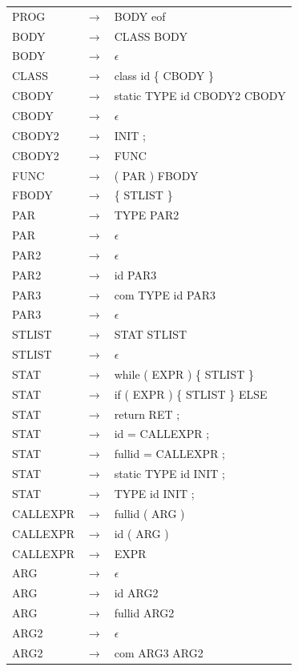 \documentclass[11pt,a4paper]{article}
\begin{document}
\begin{tabular}{l c l}
PROG & $\rightarrow$ & BODY eof \\
BODY & $\rightarrow$ & CLASS BODY \\
BODY & $\rightarrow$ & $\epsilon$ \\
CLASS & $\rightarrow$& class id \{ CBODY \} \\
CBODY &$\rightarrow$& static TYPE id CBODY2 CBODY \\
CBODY &$\rightarrow$& $\epsilon$ \\
CBODY2 &$\rightarrow$& INIT ; \\
CBODY2 &$\rightarrow$& FUNC \\
FUNC &$\rightarrow$& ( PAR ) FBODY \\
FBODY &$\rightarrow$& \{ STLIST \} \\
PAR &$\rightarrow$& TYPE PAR2 \\
PAR &$\rightarrow$& $\epsilon$ \\
PAR2 &$\rightarrow$& $\epsilon$ \\
PAR2 &$\rightarrow$& id PAR3 \\
PAR3 &$\rightarrow$& com TYPE id PAR3 \\
PAR3 &$\rightarrow$& $\epsilon$ \\
STLIST &$\rightarrow$& STAT STLIST \\
STLIST &$\rightarrow$&  $\epsilon$ \\
STAT &$\rightarrow$& while ( EXPR ) \{ STLIST \} \\
STAT &$\rightarrow$& if ( EXPR ) \{ STLIST \} ELSE \\
STAT &$\rightarrow$& return RET ; \\
STAT &$\rightarrow$& id = CALLEXPR ; \\
STAT &$\rightarrow$& fullid = CALLEXPR ; \\
STAT &$\rightarrow$& static TYPE id INIT ; \\
STAT &$\rightarrow$& TYPE id INIT ; \\
CALLEXPR &$\rightarrow$& fullid ( ARG ) \\
CALLEXPR &$\rightarrow$& id ( ARG ) \\
CALLEXPR &$\rightarrow$& EXPR \\
ARG &$\rightarrow$& $\epsilon$ \\
ARG &$\rightarrow$& id ARG2 \\
ARG &$\rightarrow$& fullid ARG2 \\
ARG2 &$\rightarrow$& $\epsilon$ \\
ARG2 &$\rightarrow$& com ARG3 ARG2 \\

\end{tabular}
\end{document}
